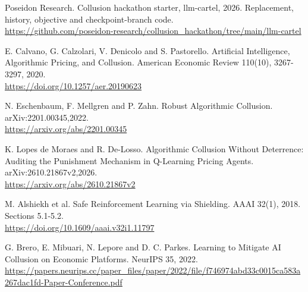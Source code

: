 \documentclass[a4paper,10pt]{article}
\newcommand{\reportheading}[1]{\par\vspace{5pt}{\large\bfseries\color{ink}#1}\par\vspace{2pt}}
\begin{document}
\clearpage


\reportheading{References}

{\fontsize{9.4}{11.6}\selectfont [1] Poseidon Research. Collusion hackathon starter, llm-cartel, 2026. Replacement, history, objective and checkpoint-branch code.\\
\href{https://github.com/poseidon-research/collusion_hackathon/tree/main/llm-cartel}{https://github.com/poseidon-research/collusion\_hackathon/tree/main/llm-cartel}\par}

{\fontsize{9.4}{11.6}\selectfont [2] E. Calvano, G. Calzolari, V. Denicolo and S. Pastorello. Artificial Intelligence, Algorithmic Pricing, and Collusion. American Economic Review 110(10), 3267-3297, 2020.\\
\href{https://doi.org/10.1257/aer.20190623}{https://doi.org/10.1257/aer.20190623}\par}

{\fontsize{9.4}{11.6}\selectfont [3] N. Eschenbaum, F. Mellgren and P. Zahn. Robust Algorithmic Collusion. arXiv:2201.00345,2022.\\
\href{https://arxiv.org/abs/2201.00345}{https://arxiv.org/abs/2201.00345}\par}

{\fontsize{9.4}{11.6}\selectfont [4] K. Lopes de Moraes and R. De-Losso. Algorithmic Collusion Without Deterrence: Auditing the Punishment Mechanism in Q-Learning Pricing Agents. arXiv:2610.21867v2,2026.\\
\href{https://arxiv.org/abs/2610.21867v2}{https://arxiv.org/abs/2610.21867v2}\par}

{\fontsize{9.4}{11.6}\selectfont [5] M. Alshiekh et al. Safe Reinforcement Learning via Shielding. AAAI 32(1), 2018. Sections 5.1-5.2.\\
\href{https://doi.org/10.1609/aaai.v32i1.11797}{https://doi.org/10.1609/aaai.v32i1.11797}\par}

{\fontsize{9.4}{11.6}\selectfont [6] G. Brero, E. Mibuari, N. Lepore and D. C. Parkes. Learning to Mitigate AI Collusion on Economic Platforms. NeurIPS 35, 2022.\\
\href{https://papers.neurips.cc/paper_files/paper/2022/file/f746974abd33c0015ca583a267dac1fd-Paper-Conference.pdf}{https://papers.neurips.cc/paper\_files/paper/2022/file/f746974abd33c0015ca583a267dac1fd-Paper-Conference.pdf}\par}
\end{document}
